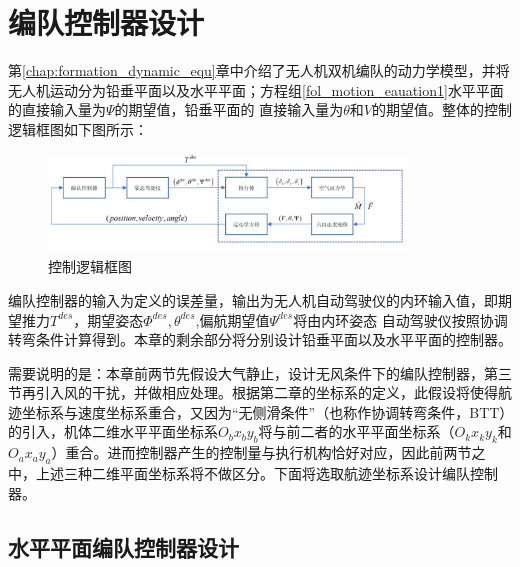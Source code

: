 \chapter{编队控制器设计}
\label{chap:controller_design}
第\ref{chap:formation_dynamic_equ}章中介绍了无人机双机编队的动力学模型，并将无人机运动分为铅垂平面以及水平平面；方程组\ref{fol_motion_eauation1}水平平面的直接输入量为$\Psi$的期望值，铅垂平面的
直接输入量为$\theta$和$V$的期望值。整体的控制逻辑框图如下图所示：
\begin{figure}[H]
    \centering
    \includegraphics[width=0.85\textwidth]{figures/c3/c3-overview_controller.png}
    \caption{控制逻辑框图}\label{fig:c3-overview_controller}
\end{figure}
编队控制器的输入为定义的误差量，输出为无人机自动驾驶仪的内环输入值，即期望推力$T^{des}$，期望姿态$\Phi^{des},\theta^{des}$,偏航期望值$\Psi^{des}$将由内环姿态
自动驾驶仪按照协调转弯条件计算得到。本章的剩余部分将分别设计铅垂平面以及水平平面的控制器。

需要说明的是：本章前两节先假设大气静止，设计无风条件下的编队控制器，第三节再引入风的干扰，并做相应处理。根据第二章的坐标系的定义，此假设将使得航迹坐标系与速度坐标系重合，又因为“无侧滑条件”（也称作协调转弯条件，BTT）的引入，机体二维水平平面坐标系$O_bx_by_b$将与前二者的水平平面坐标系（$O_kx_ky_k$和$O_ax_ay_a$）重合。进而控制器产生的控制量与执行机构恰好对应，因此前两节之中，上述三种二维平面坐标系将不做区分。下面将选取航迹坐标系设计编队控制器。
\section{水平平面编队控制器设计}
